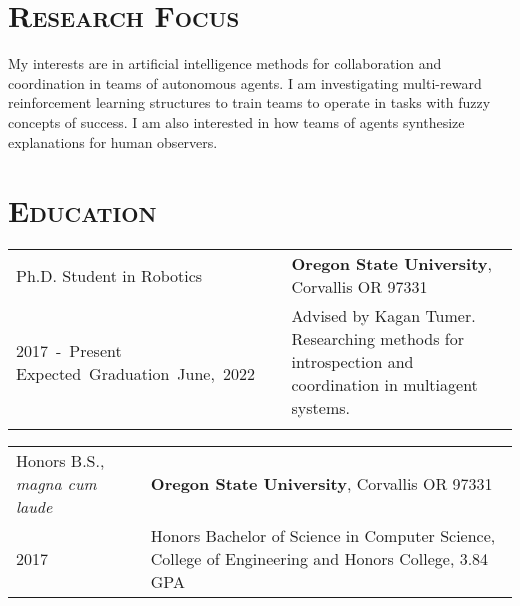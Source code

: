 \documentclass[letterpaper,10pt,titlepage]{article}
\newcommand{\leftW}{0.32\textwidth}
\begin{document}
\pagestyle{empty}%
\par{\par}

\section*{\textsc{Research Focus}}
My interests are in artificial intelligence methods for collaboration and coordination in teams of autonomous agents. I am investigating multi-reward reinforcement learning structures to train teams to operate in tasks with fuzzy concepts of success. 
I am also interested in how teams of agents synthesize explanations for human observers.

\section*{\textsc{Education}}
\begin{tabularx}{\textwidth}{p{\leftW}X}
	Ph.D. Student in Robotics & \textbf{Oregon State University}, Corvallis OR 97331\\

	\mbox{2017 - Present} \mbox{Expected Graduation June, 2022}& Advised by Kagan Tumer. Researching methods for introspection and coordination in multiagent systems.\\
	 &\\
\end{tabularx}
\begin{tabularx}{\textwidth}{p{\leftW}X}
	Honors B.S., \textit{magna cum laude} & \textbf{Oregon State University}, Corvallis OR 97331\\
	2017 & Honors Bachelor of Science in Computer Science, College of Engineering and Honors College, 3.84 GPA \\
\end{tabularx}
\end{document}
